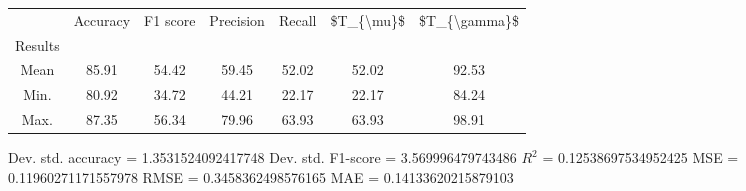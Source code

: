 \begin{tabular}{|c|c|c|c|c|c|c|}
\toprule
{} &  Accuracy &  F1 score &  Precision &  Recall &  \$T\_\{\textbackslash mu\}\$ &  \$T\_\{\textbackslash gamma\}\$ \\
Results &           &           &            &         &            &               \\
\hline
Mean    &     85.91 &     54.42 &      59.45 &   52.02 &      52.02 &         92.53 \\
Min.    &     80.92 &     34.72 &      44.21 &   22.17 &      22.17 &         84.24 \\
Max.    &     87.35 &     56.34 &      79.96 &   63.93 &      63.93 &         98.91 \\
\bottomrule
\end{tabular}

 Dev. std. accuracy = 1.3531524092417748
 Dev. std. F1-score = 3.569996479743486
 $R^2$ = 0.12538697534952425
 MSE = 0.11960271171557978
 RMSE = 0.3458362498576165
 MAE = 0.14133620215879103